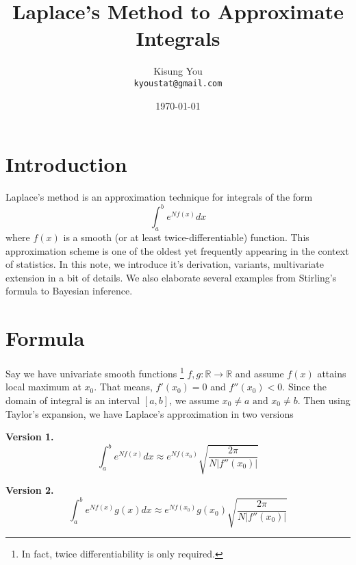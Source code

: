 \documentclass[fontsize=12pt]{article}
\title{Laplace's Method to Approximate Integrals}
\author{
	Kisung You\\
	\texttt{kyoustat@gmail.com}
}
\date{\today}
\begin{document}
\maketitle

\section{Introduction}

Laplace's method \cite{laplace} is an approximation technique for integrals of the form 
\begin{equation}\label{eq:uni}
\int_{a}^{b} e^{N f(x)} dx
\end{equation}
where $f(x)$ is a smooth (or at least twice-differentiable) function. This approximation scheme is one of the oldest yet frequently appearing in the context of statistics. In this note, we introduce it's derivation, variants, multivariate extension in a bit of details. We also elaborate several examples from Stirling's formula to Bayesian inference. 

\section{Formula}\label{sec:formula}
Say we have univariate smooth functions \footnote{In fact, twice differentiability is only required.} $f,g : \mathbb{R} \rightarrow \mathbb{R}$ and assume $f(x)$ attains local maximum at $x_0$. That means, $f'(x_0) = 0$ and $f''(x_0) < 0$. Since the domain of integral is an interval $[a,b]$, we assume $x_0 \neq a \text{ and } x_0 \neq b$.  Then using Taylor's expansion, we have Laplace's approximation in two versions

\begin{mdframed}
\textbf{Version 1.}
\begin{equation}\label{eq:version1}
\int_{a}^{b} e^{N f(x)} dx \approx e^{N f(x_0)} \sqrt{\frac{2\pi}{N |f''(x_0)|}}
\end{equation}
\end{mdframed}
\vspace{0.1cm}
\begin{mdframed}
	\textbf{Version 2.}
	\begin{equation}\label{eq:version2}
	\int_{a}^{b} e^{N f(x)} g(x) dx \approx e^{N f(x_0)} g(x_0) \sqrt{\frac{2\pi}{N |f''(x_0)|}}
	\end{equation}
\end{mdframed}
\end{document}
